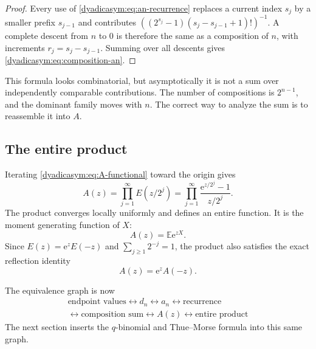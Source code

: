 \documentclass[11pt,oneside]{article}
\theoremstyle{definition}
\theoremstyle{remark}
\newcommand{\e}{\mathrm e}
\newcommand{\E}{\mathbb E}
\begin{document}
\begin{proof}
Every use of \eqref{dyadicasym:eq:an-recurrence} replaces a current index $s_j$ by a smaller prefix
$s_{j-1}$ and contributes
$((2^{s_j}-1)(s_j-s_{j-1}+1)!)^{-1}$.  A complete descent from $n$ to $0$ is therefore the
same as a composition of $n$, with increments $r_j=s_j-s_{j-1}$.  Summing over all descents
gives \eqref{dyadicasym:eq:composition-an}.
\end{proof}

This formula looks combinatorial, but asymptotically it is not a sum over independently
comparable contributions.  The number of compositions is $2^{n-1}$, and the dominant family
moves with $n$.  The correct way to analyze the sum is to reassemble it into $A$.

\subsection{The entire product}

Iterating \eqref{dyadicasym:eq:A-functional} toward the origin gives
\begin{equation}
 \boxed{
 A(z)=\prod_{j=1}^{\infty}E(z/2^j)
 =\prod_{j=1}^{\infty}\frac{\e^{z/2^j}-1}{z/2^j}.}         \label{dyadicasym:eq:A-product}
\end{equation}
The product converges locally uniformly and defines an entire function.  It is the moment
generating function of $X$:
\begin{equation}
 A(z)=\E\e^{zX}.                                            \label{dyadicasym:eq:A-mgf}
\end{equation}
Since $E(z)=\e^zE(-z)$ and $\sum_{j\ge1}2^{-j}=1$, the product also satisfies the exact
reflection identity
\begin{equation}
 A(z)=\e^zA(-z).                                             \label{dyadicasym:eq:A-reflection}
\end{equation}

The equivalence graph is now
\begin{equation*}
 \boxed{\begin{gathered}
 \text{endpoint values}\longleftrightarrow d_n\longleftrightarrow a_n
 \longleftrightarrow\text{recurrence}\\
 \longleftrightarrow\text{composition sum}\longleftrightarrow A(z)
 \longleftrightarrow\text{entire product}
 \end{gathered}}
\end{equation*}
The next section inserts the $q$-binomial and Thue--Morse formula into this same graph.
\end{document}
